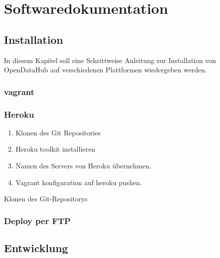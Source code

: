 \part{Softwaredokumentation}

\chapter{Installation}
In diesem Kapitel soll eine Schrittweise Anleitung zur Installation von OpenDataHub auf verschiedenen Plattformen wiedergeben werden.
\section{vagrant}
\section{Heroku}
\begin{enumerate}
\item Klonen des Git Repositories
\item Heroku toolkit installieren
\item Namen des Servers von Heroku übernehmen.
\item Vagrant konfiguration auf heroku pushen.
\end{enumerate}Klonen des Git-Repositorys

\section{Deploy per FTP}

\chapter{Entwicklung}
